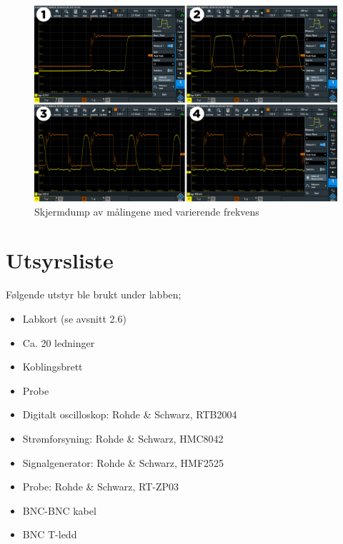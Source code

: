 \documentclass{article}
\begin{document}
\begin{figure}[t]
	\centering
	\includegraphics[width=1\linewidth]{tegneserie1}
	\caption{Skjermdump av målingene med varierende frekvens}
	\label{fig:tegneserie1}
\end{figure}


\section{Utsyrsliste}
Følgende utstyr ble brukt under labben;
\begin{itemize}
	\item Labkort (se avsnitt 2.6)
	\item Ca. 20 ledninger
	\item Koblingsbrett
	\item Probe
	\item Digitalt oscilloskop: Rohde \& Schwarz, RTB2004
	\item Strømforsyning: Rohde \& Schwarz, HMC8042
	\item Signalgenerator: Rohde \& Schwarz, HMF2525
	\item Probe: Rohde \& Schwarz, RT-ZP03
	\item BNC-BNC kabel
	\item BNC T-ledd
\end{itemize}
\end{document}
